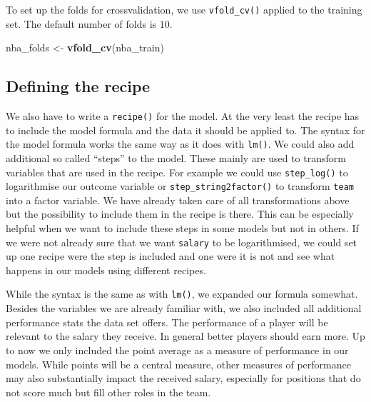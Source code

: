 \documentclass[
]{book}
\newenvironment{Shaded}{\begin{snugshade}}{\end{snugshade}}
\newcommand{\FunctionTok}[1]{\textcolor[rgb]{0.13,0.29,0.53}{\textbf{#1}}}
\newcommand{\NormalTok}[1]{#1}
\newcommand{\OtherTok}[1]{\textcolor[rgb]{0.56,0.35,0.01}{#1}}
\begin{document}
To set up the folds for crossvalidation, we use \texttt{vfold\_cv()} applied to the
training set. The default number of folds is \(10\).

\begin{Shaded}
\begin{Highlighting}[]
\NormalTok{nba\_folds }\OtherTok{\textless{}{-}} \FunctionTok{vfold\_cv}\NormalTok{(nba\_train)}
\end{Highlighting}
\end{Shaded}

\hypertarget{defining-the-recipe}{%
\subsection{Defining the recipe}\label{defining-the-recipe}}

We also have to write a \texttt{recipe()} for the model. At the very least the recipe
has to include the model formula and the data it should be applied to. The
syntax for the model formula works the same way as it does with \texttt{lm()}. We could
also add additional so called ``steps'' to the model. These mainly are used to
transform variables that are used in the recipe. For example we could use
\texttt{step\_log()} to logarithmise our outcome variable or \texttt{step\_string2factor()} to
transform \texttt{team} into a factor variable. We have already taken care of all
transformations above
but the possibility to include them in the recipe is there. This can be
especially helpful when we want to include these steps in some models but not in
others. If we were not already sure that we want \texttt{salary} to be logarithmised,
we could set up one recipe were the step is included and one were it is not and
see what happens in our models using different recipes.

While the syntax is the same as with \texttt{lm()}, we expanded our formula somewhat.
Besides the variables we are already familiar with, we also included all
additional performance stats the data set offers. The performance of a player
will be relevant to the salary they receive. In general better players should
earn more. Up to now we only included the point average as a measure of
performance in our models. While points will be a central measure, other
measures of performance may also substantially impact the received salary,
especially for positions that do not score much but fill other roles in the
team.
\end{document}
